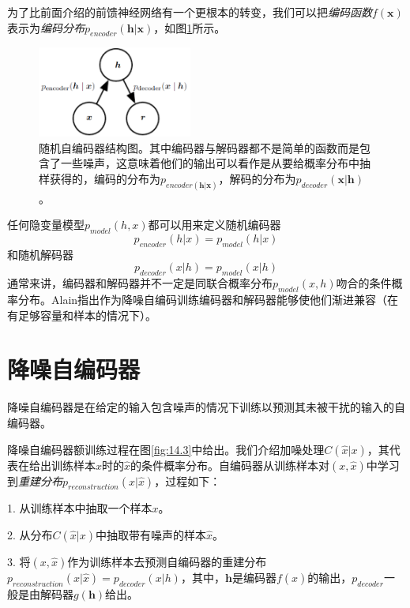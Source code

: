 为了比前面介绍的前馈神经网络有一个更根本的转变，我们可以把\emph{编码函数}$f(\bm{x})$表示为\emph{编码分布}$p_{encoder}(\bm{h}|\bm{x})$，如图\ref{fig:14.2}所示。
\begin{figure}[htbp] %
   \centering
   \includegraphics[width=2in]{fig/chap14/14_2.png} 
   \caption{随机自编码器结构图。其中编码器与解码器都不是简单的函数而是包含了一些噪声，这意味着他们的输出可以看作是从要给概率分布中抽样获得的，编码的分布为$p_{encoder(\bm{h}|\bm{x})}$，解码的分布为$p_{decoder}(\bm{x}|\bm{h})$。}
   \label{fig:14.2}
\end{figure}

任何隐变量模型$p_{model}(h,x)$都可以用来定义随机编码器
\begin{equation}
	p_{encoder}(h|x) = p_{model}(h|x)
\end{equation}
和随机解码器
\begin{equation}
	p_{decoder}(x|h) = p_{model}(x|h)
\end{equation}
通常来讲，编码器和解码器并不一定是同联合概率分布$p_{model}(x,h)$吻合的条件概率分布。Alain指出作为降噪自编码训练编码器和解码器能够使他们渐进兼容（在有足够容量和样本的情况下）。

\section{降噪自编码器}
\label{sec:14.5}
降噪自编码器是在给定的输入包含噪声的情况下训练以预测其未被干扰的输入的自编码器。

降噪自编码器额训练过程在图\ref{fig:14.3}中给出。我们介绍加噪处理$C(\hat{x}|x)$，其代表在给出训练样本$x$时的$\hat{x}$的条件概率分布。自编码器从训练样本对$(x,\hat{x})$中学习到\emph{重建分布}$p_{reconstruction}(x|\hat{x})$，过程如下：

1. 从训练样本中抽取一个样本$x$。

2. 从分布$C(\hat{x}|x)$中抽取带有噪声的样本$\hat{x}$。

3. 将$(x,\hat{x})$作为训练样本去预测自编码器的重建分布$p_{reconstruction}(x|\hat{x}) = p_{decoder}(x|h)$，其中，$\bm{h}$是编码器$f(\hat{x})$的输出，$p_{decoder}$一般是由解码器$g(\bm{h})$给出。

